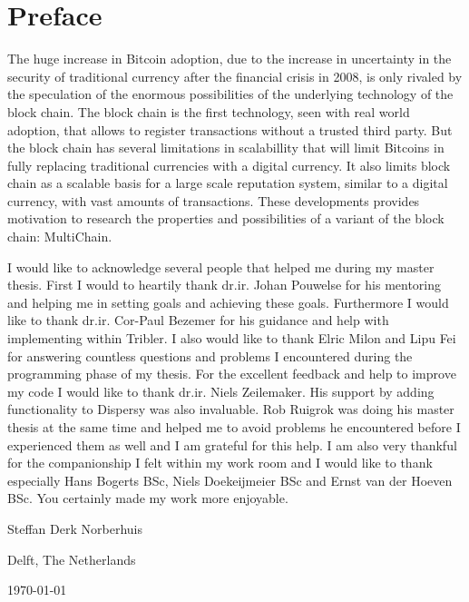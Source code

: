 \chapter*{Preface}
The huge increase in Bitcoin adoption, 
due to the increase in uncertainty in the security of traditional currency 
after the financial crisis in 2008, 
is only rivaled by the speculation of the enormous possibilities 
of the underlying technology of the block chain.
The block chain is the first technology, seen with real world adoption,
that allows to register transactions without a trusted third party.
But the block chain has several limitations in scalabillity 
that will limit Bitcoins in fully replacing traditional currencies with a digital currency.
It also limits block chain as a scalable basis for a large scale reputation system, 
similar to a digital currency, with vast amounts of transactions.
These developments provides motivation to research the properties and possibilities of a variant of the block chain:
MultiChain.

\vspace{1\baselineskip}

\noindent
I would like to acknowledge several people that helped me during my master thesis.
First I would to heartily thank dr.ir. Johan Pouwelse for his mentoring and helping me in setting goals and achieving these goals.
Furthermore I would like to thank dr.ir. Cor-Paul Bezemer for his guidance and help with implementing within Tribler. 
I also would like to thank Elric Milon and Lipu Fei for answering countless questions
and problems I encountered during the programming phase of my thesis.
For the excellent feedback and help to improve my code I would like to thank dr.ir. Niels Zeilemaker.
His support by adding functionality to Dispersy was also invaluable.
Rob Ruigrok was doing his master thesis at the same time
and helped me to avoid problems he encountered before I experienced them as well and
I am grateful for this help.
I am also very thankful for the companionship I felt within my work room 
and I would like to thank especially Hans Bogerts BSc, Niels Doekeijmeier BSc and Ernst van der Hoeven BSc.
You certainly made my work more enjoyable.

\vspace{1\baselineskip}

\noindent
Steffan Derk Norberhuis

\vspace{1\baselineskip}

\noindent
Delft, The Netherlands

\noindent
\today
